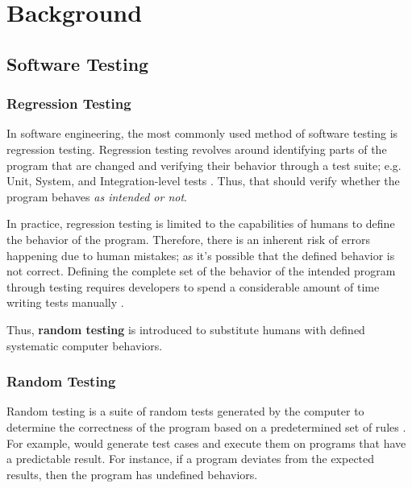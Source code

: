 \section{Background}
%

\subsection{Software Testing}
\label{sec:Testing}

\subsubsection{Regression Testing}

In software engineering, the most commonly used method of software testing is regression testing. Regression testing revolves around 
identifying parts of the program that are changed and verifying their behavior through a test suite; e.g. Unit, System, and Integration-level tests
\cite{testing}. Thus, that should verify whether the program behaves \emph{as intended or not}.

In practice, regression testing is limited to the capabilities of humans to define the behavior of the program. Therefore, there is an inherent 
risk of errors happening due to human mistakes; as it's possible that the defined behavior is not correct. Defining the complete set of the behavior 
of the intended program through testing requires developers to spend a considerable amount of time writing tests manually \cite{differentialTesting}. 

Thus, \textbf{random testing} is introduced to substitute humans with defined systematic computer behaviors.

\subsubsection{Random Testing}

Random testing is a suite of random tests generated by the computer to determine the correctness of the program based on a predetermined 
set of rules \cite{differentialTesting}. For example, \cite[Sec. 2]{randomTesting} would generate test cases and 
execute them on programs that have a predictable result. For instance, if a program deviates from the expected results, then the 
program has undefined behaviors.

